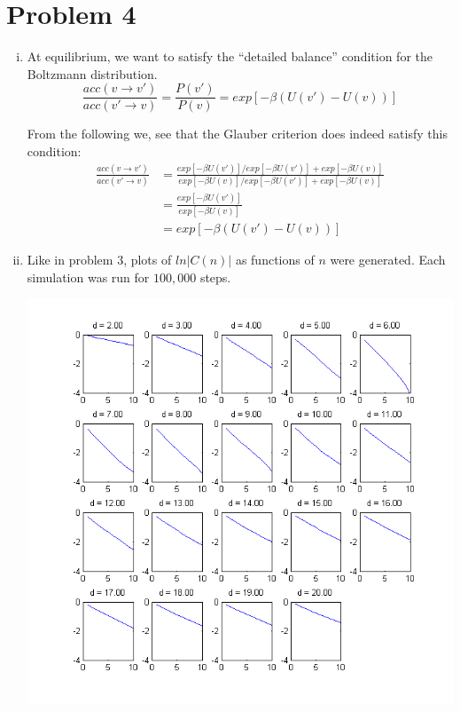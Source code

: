 \documentclass{article}
\begin{document}
\section*{Problem 4}
\begin{enumerate}[i.]
  \item At equilibrium, we want to satisfy the ``detailed balance'' condition for the Boltzmann distribution.
    $$\frac{acc(v\rightarrow v')}{acc(v'\rightarrow v)} = \frac{P(v')}{P(v)} = exp\left[-\beta (U(v') - U(v))\right]$$

    From the following we, see that the Glauber criterion does indeed satisfy this condition:
    \begin{align}
      \frac{acc(v\rightarrow v')}{acc(v'\rightarrow v)} &= \frac{exp\left[ -\beta U(v') \right] / exp\left[ -\beta U(v') \right] + exp\left[ -\beta U(v) \right]}{exp\left[ -\beta U(v) \right] / exp\left[ -\beta U(v') \right] + exp\left[ -\beta U(v) \right]} \\
      &= \frac{exp\left[ -\beta U(v') \right]}{exp\left[ -\beta U(v) \right]} \\
      &= exp\left[-\beta (U(v') - U(v))\right]
    \end{align}    

  \item Like in problem 3, plots of $ln|C(n)|$ as functions of $n$ were generated. Each simulation was run for $100,000$ steps.
    \begin{center}
      \includegraphics[scale=0.7]{prob4b}
    \end{center}


\end{enumerate}
\end{document}
